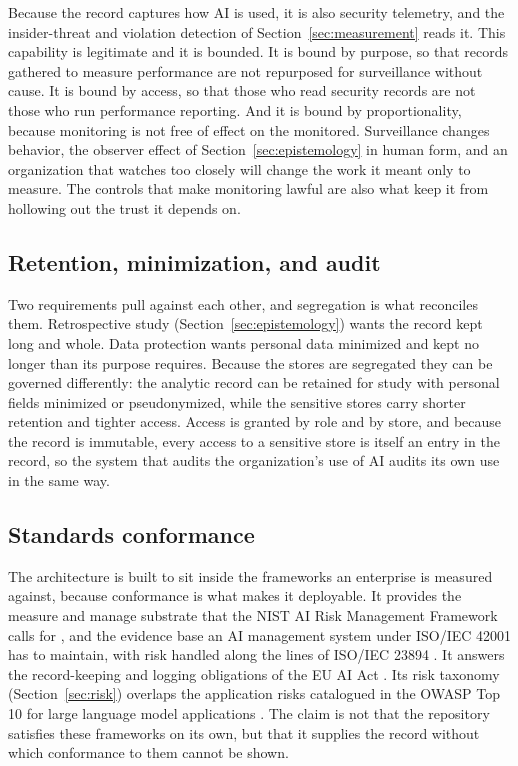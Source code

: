 \documentclass[11pt]{article}
\begin{document}
Because the record captures how AI is used, it is also security telemetry, and the
insider-threat and violation detection of Section~\ref{sec:measurement} reads it.
This capability is legitimate and it is bounded. It is bound by purpose, so that
records gathered to measure performance are not repurposed for surveillance without
cause. It is bound by access, so that those who read security records are not those
who run performance reporting. And it is bound by proportionality, because
monitoring is not free of effect on the monitored. Surveillance changes behavior,
the observer effect of Section~\ref{sec:epistemology} in human form, and an
organization that watches too closely will change the work it meant only to
measure. The controls that make monitoring lawful are also what keep it from
hollowing out the trust it depends on.

\subsection{Retention, minimization, and audit}

Two requirements pull against each other, and segregation is what reconciles them.
Retrospective study (Section~\ref{sec:epistemology}) wants the record kept long and
whole. Data protection wants personal data minimized and kept no longer than its
purpose requires. Because the stores are segregated they can be governed
differently: the analytic record can be retained for study with personal fields
minimized or pseudonymized, while the sensitive stores carry shorter retention and
tighter access. Access is granted by role and by store, and because the record is
immutable, every access to a sensitive store is itself an entry in the record, so
the system that audits the organization's use of AI audits its own use in the same
way.

\subsection{Standards conformance}

The architecture is built to sit inside the frameworks an enterprise is measured
against, because conformance is what makes it deployable. It provides the measure
and manage substrate that the NIST AI Risk Management Framework calls for
\cite{nist2023airmf}, and the evidence base an AI management system under ISO/IEC
42001 \cite{iso42001} has to maintain, with risk handled along the lines of ISO/IEC
23894 \cite{iso23894}. It answers the record-keeping and logging obligations of the
EU AI Act \cite{euaiact2024}. Its risk taxonomy (Section~\ref{sec:risk}) overlaps
the application risks catalogued in the OWASP Top 10 for large language model
applications \cite{owaspllm}. The claim is not that the repository satisfies these
frameworks on its own, but that it supplies the record without which conformance to
them cannot be shown.
\end{document}
